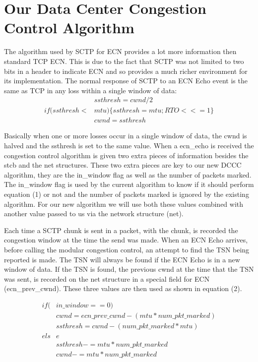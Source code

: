 \documentclass[12pt]{article}
\begin{document}
\section{Our Data Center Congestion Control Algorithm}
\label{algo}
The algorithm used by SCTP for ECN provides a lot more information then
standard TCP ECN. This is due to the fact that SCTP was not limited to two bits
in a header to indicate ECN and so provides a much richer environment for its
implementation. The normal response of SCTP to an ECN Echo event is the same
as TCP in any loss within a single window of data:
\begin{equation}
\begin{split}
&ssthresh = cwnd / 2\\
if (ssthresh < &mtu) \{ ssthresh = mtu; RTO <<= 1 \} \\
&cwnd = ssthresh
\end{split}
\end{equation}

Basically when one or more losses occur in a single window of data, the cwnd is halved and
the ssthresh is set to the same value. When a ecn\_echo is received the congestion
control algorithm is given two extra pieces of information besides the stcb and the 
net structures. These two extra pieces are key to our new DCCC algorithm, they are
the in\_window flag as well as the number of packets marked. The in\_window flag
is used by the current algorithm to know if it should perform equation (1) or not and
the number of packets marked is ignored by the existing algorithm. For
our new algorithm we will use both these values combined with another value passed
to us via the network structure (net).

Each time a SCTP chunk is sent in a packet, with the chunk, is recorded the congestion
window at the time the send was made. When an ECN Echo arrives, before calling
the modular congestion control, an attempt to find the TSN being reported is made. The TSN
will always be found if the ECN Echo is in a new window of data. If the TSN
is found, the previous cwnd at the time that the TSN was sent, is recorded on
the net structure in a special field for ECN (ecn\_prev\_cwnd).  These three values are then used as shown in equation (2).

\begin{equation}
\begin{split}
if (&in\_window == 0) \\
&cwnd = ecn\_prev\_cwnd - (mtu * num\_pkt\_marked) \\
&ssthresh = cwnd - (num\_pkt\_marked * mtu) \\
els&e\\
&ssthresh -= mtu * num\_pkt\_marked \\
&cwnd -= mtu * num\_pkt\_marked
\end{split}
\end{equation}
\end{document}
